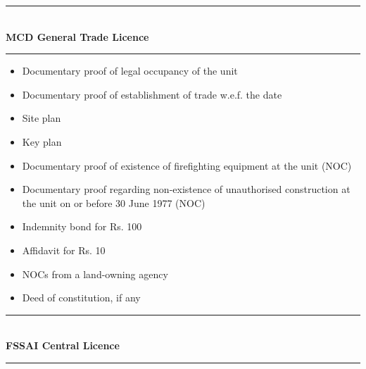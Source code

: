\documentclass[a4paper, 12pt, twoside]{article}
\begin{document}
\noindent\rule{16cm}{0.4pt}\\
\textbf{MCD General Trade Licence} 
	\\
\noindent\rule{16cm}{0.4pt}
\begin{itemize}[noitemsep]
\item Documentary proof of legal occupancy of the unit 
\item Documentary proof of establishment of trade w.e.f. the date 
\item Site plan 
\item Key plan 
\item Documentary proof of existence of firefighting equipment at the unit (NOC) 
\item Documentary proof regarding non-existence of unauthorised construction at the unit on or before 30 June 1977 (NOC) 
\item Indemnity bond for Rs. 100 
\item Affidavit for Rs. 10 
\item NOCs from a land-owning agency 
\item Deed of constitution, if any 
\end{itemize}
\noindent\rule{16cm}{0.4pt}\\
\textbf{FSSAI Central Licence} \\
\noindent\rule{16cm}{0.4pt}
\end{document}

